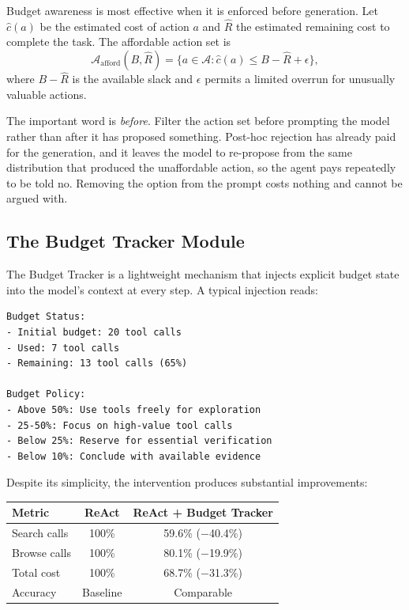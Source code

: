 \documentclass[11pt]{book}
\begin{document}
Budget awareness is most effective when it is enforced before generation. Let $\hat{c}(a)$ be the estimated cost of action $a$ and $\hat{R}$ the estimated remaining cost to complete the task. The affordable action set is
\[
\mathcal{A}_{\text{afford}}(B, \hat{R}) = \{ a \in \mathcal{A} : \hat{c}(a) \leq B - \hat{R} + \epsilon \},
\]
where $B - \hat{R}$ is the available slack and $\epsilon$ permits a limited overrun for unusually valuable actions.

The important word is \textit{before}. Filter the action set before prompting the model rather than after it has proposed something. Post-hoc rejection has already paid for the generation, and it leaves the model to re-propose from the same distribution that produced the unaffordable action, so the agent pays repeatedly to be told no. Removing the option from the prompt costs nothing and cannot be argued with.

\subsection{The Budget Tracker Module}

The Budget Tracker \cite{bats2025} is a lightweight mechanism that injects explicit budget state into the model's context at every step. A typical injection reads:
\begin{verbatim}
Budget Status:
- Initial budget: 20 tool calls
- Used: 7 tool calls
- Remaining: 13 tool calls (65%)

Budget Policy:
- Above 50%: Use tools freely for exploration
- 25-50%: Focus on high-value tool calls
- Below 25%: Reserve for essential verification
- Below 10%: Conclude with available evidence
\end{verbatim}

Despite its simplicity, the intervention produces substantial improvements:

\begin{center}
\begin{tabular}{lcc}
\toprule
Metric & ReAct & ReAct + Budget Tracker \\
\midrule
Search calls & 100\% & 59.6\% ($-$40.4\%) \\
Browse calls & 100\% & 80.1\% ($-$19.9\%) \\
Total cost & 100\% & 68.7\% ($-$31.3\%) \\
Accuracy & Baseline & Comparable \\
\bottomrule
\end{tabular}
\end{center}
\end{document}
